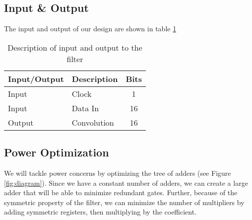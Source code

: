\subsection{Input \& Output}
The input and output of our design are shown in table \ref{table:inputoutput}

\begin{table}[ht]
\centering
\begin{tabular}{l | l | c}
\hline
Input/Output & Description & Bits \\
\hline \hline
Input & Clock & 1 \\
Input & Data In & 16 \\
Output & Convolution & 16 \\
\end{tabular}
\caption{Description of input and output to the filter}
\label{table:inputoutput}
\end{table}



\subsection{Power Optimization}

We will tackle power concerns by optimizing the tree of adders (see Figure \ref{fig:diagram}).  Since we have a constant number of adders, we can create a large adder that will be able to minimize redundant gates.  Further, because of the symmetric property of the filter, we can minimize the number of multipliers by adding symmetric registers, then multiplying by the coefficient.  



